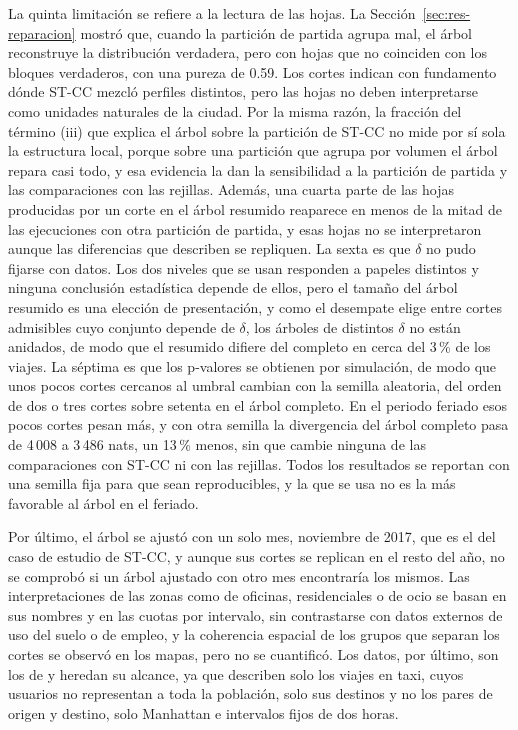 La quinta limitación se refiere a la lectura de las hojas. La
Sección~\ref{sec:res-reparacion} mostró que, cuando la partición de partida agrupa
mal, el árbol reconstruye la distribución verdadera, pero con hojas que no
coinciden con los bloques verdaderos, con una pureza de 0.59. Los cortes indican
con fundamento dónde ST-CC mezcló perfiles distintos, pero las hojas no deben
interpretarse como unidades naturales de la ciudad. Por la misma razón, la
fracción del término (iii) que explica el árbol sobre la partición de ST-CC no
mide por sí sola la estructura local, porque sobre una partición que agrupa por
volumen el árbol repara casi todo, y esa evidencia la dan la sensibilidad a la
partición de partida y las comparaciones con las rejillas. Además, una cuarta parte de
las hojas producidas por un corte en el árbol resumido reaparece en menos de la
mitad de las ejecuciones con otra partición de partida, y esas hojas no se
interpretaron aunque las diferencias que describen se repliquen. La sexta es que
$\delta$ no pudo fijarse con datos. Los dos niveles que se usan responden a papeles
distintos y ninguna conclusión estadística depende de ellos, pero el tamaño del
árbol resumido es una elección de presentación, y como el desempate elige entre
cortes admisibles cuyo conjunto depende de $\delta$, los árboles de distintos
$\delta$ no están anidados, de modo que el resumido difiere del completo en cerca
del 3\,\% de los viajes. La séptima es que los p-valores se
obtienen por simulación, de modo que unos pocos cortes cercanos al umbral cambian
con la semilla aleatoria, del orden de dos o tres cortes sobre setenta en el
árbol completo. En el periodo feriado esos pocos cortes pesan más, y con otra
semilla la divergencia del árbol completo pasa de 4\,008 a 3\,486 nats, un 13\,\%
menos, sin que cambie ninguna de las comparaciones con ST-CC ni con las rejillas.
Todos los resultados se reportan con una semilla fija para que sean
reproducibles, y la que se usa no es la más favorable al árbol en el feriado.

Por último, el árbol se ajustó con un solo mes, noviembre de 2017, que es el del
caso de estudio de ST-CC, y aunque sus cortes se replican en el resto del año, no
se comprobó si un árbol ajustado con otro mes encontraría los mismos. Las
interpretaciones de las zonas como de oficinas, residenciales o de ocio se basan en
sus nombres y en las cuotas por intervalo, sin contrastarse con datos externos de
uso del suelo o de empleo, y la coherencia espacial de los grupos que separan los
cortes se observó en los mapas, pero no se cuantificó. Los datos, por último, son
los de \citet{Liu2021} y heredan su alcance, ya que describen solo los viajes en
taxi, cuyos usuarios no representan a toda la población, solo sus destinos y no
los pares de origen y destino, solo Manhattan e intervalos fijos de dos horas.
